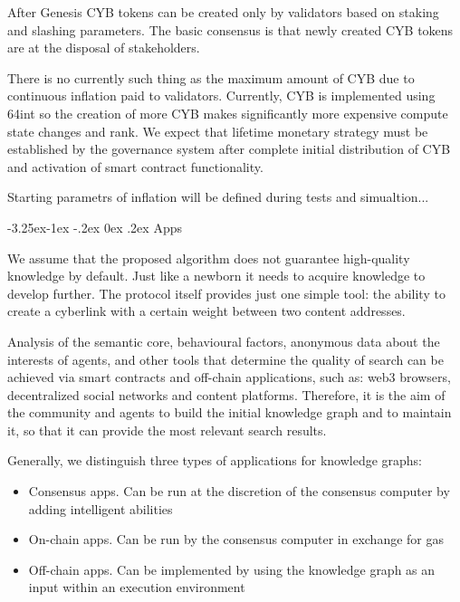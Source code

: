 \documentclass[8pt,oneside]{amsart}
\makeatletter
\renewcommand\subsection{\@startsection{subsection}{2}{\z@}%
                                     {-3.25ex\@plus -1ex \@minus -.2ex}%
                                     {0ex \@plus .2ex}%
                                     {\play\Large}}%
\newcommand{\titleSection}[1]{\subsection{#1}}
\newenvironment{Figure}
  {\par\medskip\noindent\minipage{\linewidth}}
  {\endminipage\par\medskip}
\makeatother
\begin{document}
\begin{Abstract}
\begin{itemize}
\end{itemize}

\begin{Figure}
 \centering
 
\end{Figure}

After Genesis CYB tokens can be created only by validators based on staking and slashing parameters. The basic consensus is that newly created CYB tokens are at the disposal of stakeholders.

There is no currently such thing as the maximum amount of CYB due to continuous inflation paid to validators. Currently, CYB is implemented using 64int so the creation of more CYB makes significantly more expensive compute state changes and rank. We expect that lifetime monetary strategy must be established by the governance system after complete initial distribution of CYB and activation of smart contract functionality.

Starting parametrs of inflation will be defined during tests and simualtion...

\titleSection{Apps}\label{apps}

We assume that the proposed algorithm does not guarantee high-quality knowledge by default. Just like a newborn it needs to acquire knowledge to develop further. The protocol itself provides just one simple tool: the ability to create a cyberlink with a certain weight between two content addresses.

Analysis of the semantic core, behavioural factors, anonymous data about the interests of agents, and other tools that determine the quality of search can be achieved via smart contracts and off-chain applications, such as: web3 browsers, decentralized social networks and content platforms. Therefore, it is the aim of the community and agents to build the initial knowledge graph and to maintain it, so that it can provide the most relevant search results.

Generally, we distinguish three types of applications for knowledge graphs:

\begin{itemize}
\item Consensus apps. Can be run at the discretion of the consensus computer by adding intelligent abilities
\item On-chain apps. Can be run by the consensus computer in exchange for gas
\item Off-chain apps. Can be implemented by using the knowledge graph as an input within an execution environment
\end{itemize}


\end{Abstract}
\end{document}
